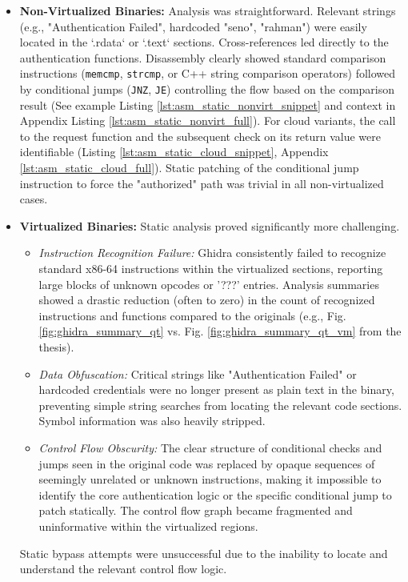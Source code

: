 \begin{itemize}
    \item \textbf{Non-Virtualized Binaries:} Analysis was straightforward. Relevant strings (e.g., "Authentication Failed", hardcoded "seno", "rahman") were easily located in the `.rdata` or `.text` sections. Cross-references led directly to the authentication functions. Disassembly clearly showed standard comparison instructions (\texttt{memcmp}, \texttt{strcmp}, or C++ string comparison operators) followed by conditional jumps (\texttt{JNZ}, \texttt{JE}) controlling the flow based on the comparison result (See example Listing \ref{lst:asm_static_nonvirt_snippet} and context in Appendix Listing \ref{lst:asm_static_nonvirt_full}). For cloud variants, the call to the request function and the subsequent check on its return value were identifiable (Listing \ref{lst:asm_static_cloud_snippet}, Appendix \ref{lst:asm_static_cloud_full}). Static patching of the conditional jump instruction to force the "authorized" path was trivial in all non-virtualized cases.
    \item \textbf{Virtualized Binaries:} Static analysis proved significantly more challenging.
        \begin{itemize}
            \item \textit{Instruction Recognition Failure:} Ghidra consistently failed to recognize standard x86-64 instructions within the virtualized sections, reporting large blocks of unknown opcodes or '???' entries. Analysis summaries showed a drastic reduction (often to zero) in the count of recognized instructions and functions compared to the originals (e.g., Fig. \ref{fig:ghidra_summary_qt} vs. Fig. \ref{fig:ghidra_summary_qt_vm} from the thesis).
            \item \textit{Data Obfuscation:} Critical strings like "Authentication Failed" or hardcoded credentials were no longer present as plain text in the binary, preventing simple string searches from locating the relevant code sections. Symbol information was also heavily stripped.
            \item \textit{Control Flow Obscurity:} The clear structure of conditional checks and jumps seen in the original code was replaced by opaque sequences of seemingly unrelated or unknown instructions, making it impossible to identify the core authentication logic or the specific conditional jump to patch statically. The control flow graph became fragmented and uninformative within the virtualized regions.
        \end{itemize}
    Static bypass attempts were unsuccessful due to the inability to locate and understand the relevant control flow logic.
\end{itemize}

